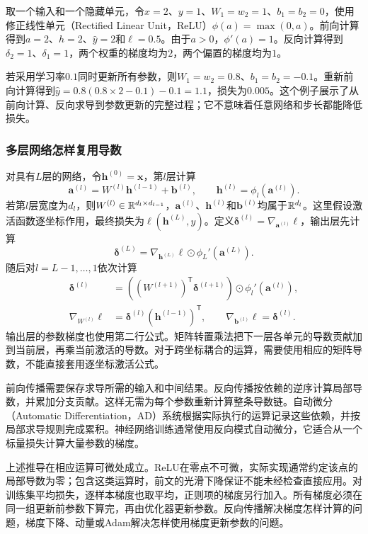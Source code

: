 取一个输入和一个隐藏单元，令$x=2$、$y=1$、$W_1=w_2=1$、$b_1=b_2=0$，使用修正线性单元（Rectified Linear Unit，ReLU）$\phi(a)=\max(0,a)$。前向计算得到$a=2$、$h=2$、$\hat y=2$和$\ell=0.5$。由于$a>0$，$\phi'(a)=1$。反向计算得到$\delta_2=1$、$\delta_1=1$，两个权重的梯度均为$2$，两个偏置的梯度均为$1$。

若采用学习率$0.1$同时更新所有参数，则$W_1=w_2=0.8$、$b_1=b_2=-0.1$。重新前向计算得到$\hat y=0.8(0.8\times2-0.1)-0.1=1.1$，损失为$0.005$。这个例子展示了从前向计算、反向求导到参数更新的完整过程；它不意味着任意网络和步长都能降低损失。

\subsubsection{多层网络怎样复用导数}
对具有$L$层的网络，令$\bm h^{(0)}=\bm x$，第$l$层计算
\begin{equation}
 \bm a^{(l)}=W^{(l)}\bm h^{(l-1)}+\bm b^{(l)},\qquad
 \bm h^{(l)}=\phi_l(\bm a^{(l)}).
\end{equation}
若第$l$层宽度为$d_l$，则$W^{(l)}\in\mathbb{R}^{d_l\times d_{l-1}}$，$\bm a^{(l)}$、$\bm h^{(l)}$和$\bm b^{(l)}$均属于$\mathbb{R}^{d_l}$。这里假设激活函数逐坐标作用，最终损失为$\ell(\bm h^{(L)},y)$。定义$\bm\delta^{(l)}=\nabla_{\bm a^{(l)}}\ell$，输出层先计算
\begin{equation}
 \bm\delta^{(L)}=\nabla_{\bm h^{(L)}}\ell\odot\phi_L'(\bm a^{(L)}).
\end{equation}
随后对$l=L-1,\ldots,1$依次计算
\begin{align}
 \bm\delta^{(l)}
 &=\left((W^{(l+1)})^{\mathsf T}\bm\delta^{(l+1)}\right)
   \odot\phi_l'(\bm a^{(l)}),\\
 \nabla_{W^{(l)}}\ell
 &=\bm\delta^{(l)}(\bm h^{(l-1)})^{\mathsf T},\qquad
 \nabla_{\bm b^{(l)}}\ell=\bm\delta^{(l)}.
 \label{eq:solving-backprop-recursion}
\end{align}
输出层的参数梯度也使用第二行公式。矩阵转置乘法把下一层各单元的导数贡献加到当前层，再乘当前激活的导数。对于跨坐标耦合的运算，需要使用相应的矩阵导数，不能直接套用逐坐标激活公式。

前向传播需要保存求导所需的输入和中间结果。反向传播按依赖的逆序计算局部导数，并累加分支贡献。这样无需为每个参数重新计算整条导数链。自动微分（Automatic Differentiation，AD）系统根据实际执行的运算记录这些依赖，并按局部求导规则完成累积。神经网络训练通常使用反向模式自动微分，它适合从一个标量损失计算大量参数的梯度。

上述推导在相应运算可微处成立。ReLU在零点不可微，实际实现通常约定该点的局部导数为零；包含这类运算时，前文的光滑下降保证不能未经检查直接应用。对训练集平均损失，逐样本梯度也取平均，正则项的梯度另行加入。所有梯度必须在同一组更新前参数下算完，再由优化器更新参数。反向传播解决梯度怎样计算的问题，梯度下降、动量或Adam解决怎样使用梯度更新参数的问题。

